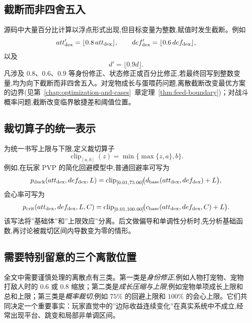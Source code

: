 \subsection{截断而非四舍五入}

源码中大量百分比计算以浮点形式出现,但目标变量为整数,赋值时发生截断。例如
\begin{equation}
    att_{\mathrm{dex}}^{\prime}=\lfloor 0.8\,att_{\mathrm{dex}} \rfloor, \qquad def_{\mathrm{dex}}^{\prime}=\lfloor 0.6\,def_{\mathrm{dex}} \rfloor,
\end{equation}
以及
\begin{equation}
    d' = \lfloor 0.9 d \rfloor.
\end{equation}
凡涉及 $0.8$、$0.6$、$0.9$ 等身份修正、状态修正或百分比修正,若最终回写到整数变量,均为向下截断而非四舍五入。对宠物成长与蛋喂药问题,离散截断改变最优方案的边界(见第~\ref{chap:optimization-and-cases}~章定理~\ref{thm:feed-boundary})；对战斗概率问题,截断改变临界敏捷差和阈值位置。

\subsection{裁切算子的统一表示}

为统一书写上限与下限,定义裁切算子
\begin{equation}
    \operatorname{clip}_{[a,b]}(z) = \min\{\max\{z,a\},b\}.
\end{equation}
例如,在玩家 PVP 的简化回避模型中,普通回避率可写为
\begin{equation}
    p_{\mathrm{duck}}(att_{\mathrm{dex}},def_{\mathrm{dex}},L) = \operatorname{clip}_{[0.01,75.00]}\!\bigl(d_{\mathrm{base}}(att_{\mathrm{dex}},def_{\mathrm{dex}})+L\bigr),
\end{equation}
会心率可写为
\begin{equation}
    p_{\mathrm{crit}}(att_{\mathrm{dex}},def_{\mathrm{dex}},L,C) = \operatorname{clip}_{[0.01,100.00]}\!\bigl(c_{\mathrm{base}}(att_{\mathrm{dex}},def_{\mathrm{dex}},C)+L\bigr).
\end{equation}
该写法将”基础体”和”上限效应”分离。后文做偏导和单调性分析时,先分析基础函数,再讨论被裁切区间内导数变为零的情形。

\subsection{需要特别留意的三个离散位置}

全文中需要谨慎处理的离散点有三类。第一类是\emph{身份修正},例如人物打宠物、宠物打敌人时的 $0.6$ 或 $0.8$ 缩放；第二类是\emph{成长压缩与上限},例如宠物单项成长上限和总和上限；第三类是\emph{概率裁切},例如 $75\%$ 的回避上限和 $100\%$ 的会心上限。它们共同决定一个重要事实：玩家直觉中的”边际收益连续变化”在真实系统中不成立,经常出现平台、跳变和局部非单调区间。

